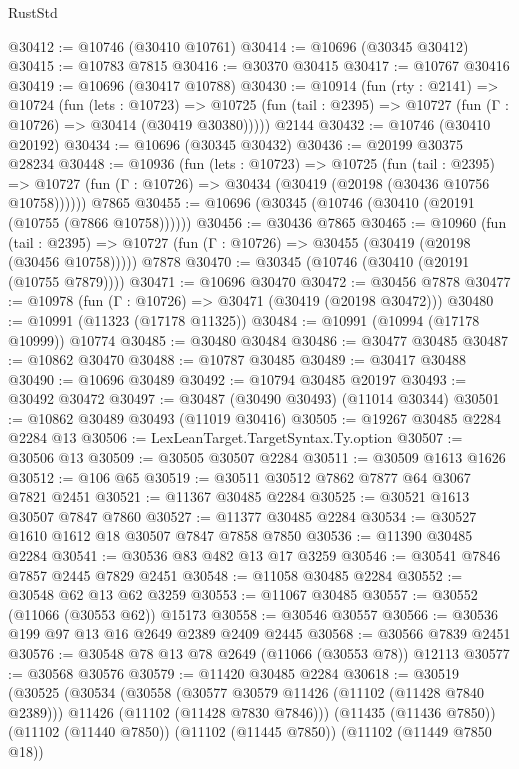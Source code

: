 \begin{lexlean}{RustStd}
\begin{coremodule}
@30412 := @10746 (@30410 @10761)
@30414 := @10696 (@30345 @30412)
@30415 := @10783 @7815
@30416 := @30370 @30415
@30417 := @10767 @30416
@30419 := @10696 (@30417 @10788)
@30430 := @10914
    (fun (rty : @2141) =>
    @10724
      (fun (lets : @10723) =>
      @10725 (fun (tail : @2395) => @10727 (fun (Γ : @10726) => @30414 (@30419 @30380)))))
    @2144
@30432 := @10746 (@30410 @20192)
@30434 := @10696 (@30345 @30432)
@30436 := @20199 @30375 @28234
@30448 := @10936
    (fun (lets : @10723) =>
    @10725
      (fun (tail : @2395) =>
      @10727 (fun (Γ : @10726) => @30434 (@30419 (@20198 (@30436 @10756 @10758))))))
    @7865
@30455 := @10696 (@30345 (@10746 (@30410 (@20191 (@10755 (@7866 @10758))))))
@30456 := @30436 @7865
@30465 := @10960
    (fun (tail : @2395) => @10727 (fun (Γ : @10726) => @30455 (@30419 (@20198 (@30456 @10758)))))
    @7878
@30470 := @30345 (@10746 (@30410 (@20191 (@10755 @7879))))
@30471 := @10696 @30470
@30472 := @30456 @7878
@30477 := @10978 (fun (Γ : @10726) => @30471 (@30419 (@20198 @30472)))
@30480 := @10991 (@11323 (@17178 @11325))
@30484 := @10991 (@10994 (@17178 @10999)) @10774
@30485 := @30480 @30484
@30486 := @30477 @30485
@30487 := @10862 @30470
@30488 := @10787 @30485
@30489 := @30417 @30488
@30490 := @10696 @30489
@30492 := @10794 @30485 @20197
@30493 := @30492 @30472
@30497 := @30487 (@30490 @30493) (@11014 @30344)
@30501 := @10862 @30489 @30493 (@11019 @30416)
@30505 := @19267 @30485 @2284 @2284 @13
@30506 := LexLeanTarget.TargetSyntax.Ty.option
@30507 := @30506 @13
@30509 := @30505 @30507 @2284
@30511 := @30509 @1613 @1626
@30512 := @106 @65
@30519 := @30511 @30512 @7862 @7877 @64 @3067 @7821 @2451
@30521 := @11367 @30485 @2284
@30525 := @30521 @1613 @30507 @7847 @7860
@30527 := @11377 @30485 @2284
@30534 := @30527 @1610 @1612 @18 @30507 @7847 @7858 @7850
@30536 := @11390 @30485 @2284
@30541 := @30536 @83 @482 @13 @17 @3259
@30546 := @30541 @7846 @7857 @2445 @7829 @2451
@30548 := @11058 @30485 @2284
@30552 := @30548 @62 @13 @62 @3259
@30553 := @11067 @30485
@30557 := @30552 (@11066 (@30553 @62)) @15173
@30558 := @30546 @30557
@30566 := @30536 @199 @97 @13 @16 @2649 @2389 @2409 @2445
@30568 := @30566 @7839 @2451
@30576 := @30548 @78 @13 @78 @2649 (@11066 (@30553 @78)) @12113
@30577 := @30568 @30576
@30579 := @11420 @30485 @2284
@30618 := @30519
    (@30525
      (@30534
        (@30558
          (@30577 @30579 @11426 (@11102 (@11428 @7840 @2389)))
          @11426
          (@11102 (@11428 @7830 @7846)))
        (@11435 (@11436 @7850))
        (@11102 (@11440 @7850))
        (@11102 (@11445 @7850))
        (@11102 (@11449 @7850 @18))

\end{coremodule}
\end{lexlean}
